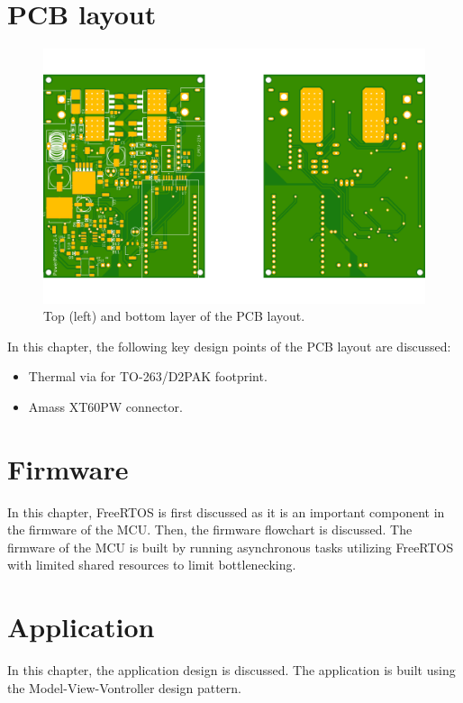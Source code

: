 \documentclass[12pt,letterpaper]{report}
\begin{document}
\chapter{PCB layout}
\justify
\begin{figure}[!h]
  \centerline{\includegraphics[width=\linewidth]{media/power_meter_pcb_v2_2.png}}
  \caption{Top (left) and bottom layer of the PCB layout.}
\end{figure}
In this chapter, the following key design points of the PCB layout are discussed:
\begin{itemize}
  \item Thermal via for TO-263/D2PAK footprint.
  \item Amass XT60PW connector.
\end{itemize}
\pagebreak


\chapter{Firmware}
\justify
In this chapter, FreeRTOS is first discussed as it is an important component in the firmware of the MCU. Then, the firmware flowchart is discussed. The firmware of the MCU is built by running asynchronous tasks utilizing FreeRTOS with limited shared resources to limit bottlenecking.
\pagebreak


\chapter{Application}
\justify
In this chapter, the application design is discussed. The application is built using the Model-View-Vontroller design pattern. 
\end{document}
